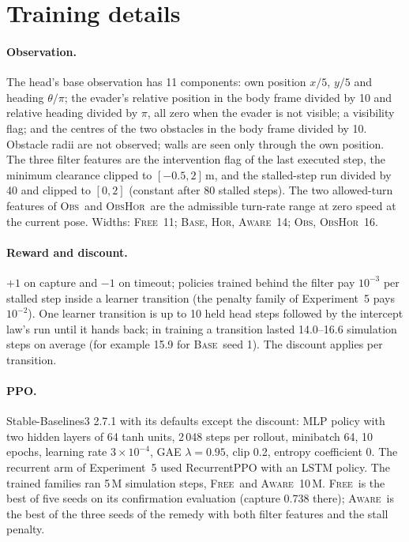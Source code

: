 \documentclass{l4dc2027}
\newcommand{\Base}{\textsc{Base}}
\newcommand{\Obs}{\textsc{Obs}}
\newcommand{\Hor}{\textsc{Hor}}
\newcommand{\ObsHor}{\textsc{ObsHor}}
\newcommand{\Free}{\textsc{Free}}
\newcommand{\Aware}{\textsc{Aware}}
\begin{document}
\section{Training details}

\paragraph{Observation.} The head's base observation has 11 components: own position $x/5$, $y/5$ and heading $\theta/\pi$; the evader's relative position in the body frame divided by 10 and relative heading divided by $\pi$, all zero when the evader is not visible; a visibility flag; and the centres of the two obstacles in the body frame divided by 10. Obstacle radii are not observed; walls are seen only through the own position. The three filter features are the intervention flag of the last executed step, the minimum clearance clipped to $[-0.5, 2]$\,m, and the stalled-step run divided by 40 and clipped to $[0, 2]$ (constant after 80 stalled steps). The two allowed-turn features of \Obs\ and \ObsHor\ are the admissible turn-rate range at zero speed at the current pose. Widths: \Free\ 11; \Base, \Hor, \Aware\ 14; \Obs, \ObsHor\ 16.

\paragraph{Reward and discount.} $+1$ on capture and $-1$ on timeout; policies trained behind the filter pay $10^{-3}$ per stalled step inside a learner transition (the penalty family of Experiment~5 pays $10^{-2}$). One learner transition is up to 10 held head steps followed by the intercept law's run until it hands back; in training a transition lasted 14.0--16.6 simulation steps on average (for example 15.9 for \Base\ seed 1). The discount applies per transition.

\paragraph{PPO.} Stable-Baselines3 2.7.1 with its defaults except the discount: MLP policy with two hidden layers of 64 tanh units, 2\,048 steps per rollout, minibatch 64, 10 epochs, learning rate $3\times10^{-4}$, GAE $\lambda = 0.95$, clip 0.2, entropy coefficient 0. The recurrent arm of Experiment~5 used RecurrentPPO with an LSTM policy. The trained families ran 5\,M simulation steps, \Free\ and \Aware\ 10\,M. \Free\ is the best of five seeds on its confirmation evaluation (capture 0.738 there); \Aware\ is the best of the three seeds of the remedy with both filter features and the stall penalty.
\end{document}
